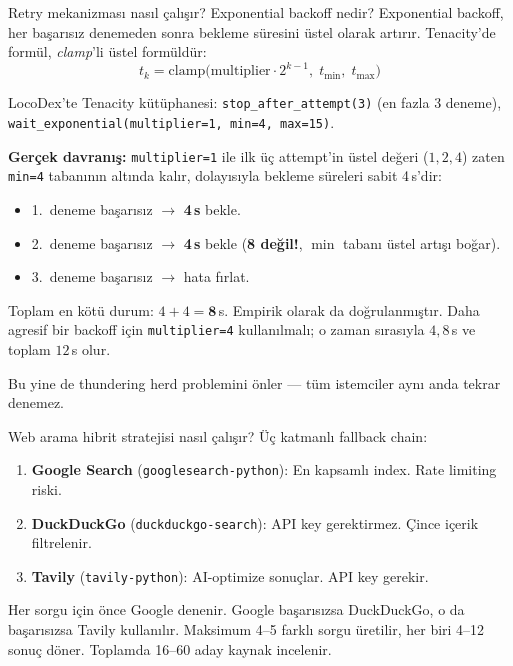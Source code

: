 \begin{mulakat}{Retry mekanizmas{\i} nas{\i}l \c{c}al{\i}\c{s}{\i}r? Exponential backoff nedir?}
Exponential backoff, her ba\c{s}ar{\i}s{\i}z denemeden sonra bekleme s\"{u}resini \"{u}stel olarak art{\i}r{\i}r. Tenacity'de form\"{u}l, \emph{clamp}'li \"{u}stel form\"{u}ld\"{u}r:
\begin{equation}
  t_k = \mathrm{clamp}\bigl(\text{multiplier} \cdot 2^{k-1},\; t_{\min},\; t_{\max}\bigr)
\end{equation}

LocoDex'te Tenacity k\"{u}t\"{u}phanesi: \texttt{stop\_after\_attempt(3)} (en fazla 3 deneme), \texttt{wait\_exponential(multiplier=1, min=4, max=15)}.

\textbf{Ger\c{c}ek davran{\i}\c{s}:} \texttt{multiplier=1} ile ilk \"{u}\c{c} attempt'in \"{u}stel de\u{g}eri ($1, 2, 4$) zaten \texttt{min=4} taban{\i}n{\i}n alt{\i}nda kal{\i}r, dolay{\i}s{\i}yla bekleme s\"{u}releri sabit 4\,s'dir:

\begin{itemize}
  \item 1.~deneme ba\c{s}ar{\i}s{\i}z $\rightarrow$ \textbf{4\,s} bekle.
  \item 2.~deneme ba\c{s}ar{\i}s{\i}z $\rightarrow$ \textbf{4\,s} bekle (\textbf{8 de\u{g}il!}, $\min$ taban{\i} \"{u}stel art{\i}\c{s}{\i} bo\u{g}ar).
  \item 3.~deneme ba\c{s}ar{\i}s{\i}z $\rightarrow$ hata f{\i}rlat.
\end{itemize}

Toplam en k\"{o}t\"{u} durum: $4 + 4 = \mathbf{8}$\,s. Empirik olarak da do\u{g}rulanm{\i}\c{s}t{\i}r. Daha agresif bir backoff i\c{c}in \texttt{multiplier=4} kullan{\i}lmal{\i}; o zaman s{\i}ras{\i}yla $4, 8$\,s ve toplam $12$\,s olur.

Bu yine de thundering herd problemini \"{o}nler --- t\"{u}m istemciler ayn{\i} anda tekrar denemez.
\end{mulakat}

\begin{mulakat}{Web arama hibrit stratejisi nas{\i}l \c{c}al{\i}\c{s}{\i}r?}
\"{U}\c{c} katmanl{\i} fallback chain:
\begin{enumerate}
  \item \textbf{Google Search} (\texttt{googlesearch-python}): En kapsaml{\i} index. Rate limiting riski.
  \item \textbf{DuckDuckGo} (\texttt{duckduckgo-search}): API key gerektirmez. \c{C}ince i\c{c}erik filtrelenir.
  \item \textbf{Tavily} (\texttt{tavily-python}): AI-optimize sonu\c{c}lar. API key gerekir.
\end{enumerate}

Her sorgu i\c{c}in \"{o}nce Google denenir. Google ba\c{s}ar{\i}s{\i}zsa DuckDuckGo, o da ba\c{s}ar{\i}s{\i}zsa Tavily kullan{\i}l{\i}r. Maksimum 4--5 farkl{\i} sorgu \"{u}retilir, her biri 4--12 sonu\c{c} d\"{o}ner. Toplamda 16--60 aday kaynak incelenir.
\end{mulakat}

